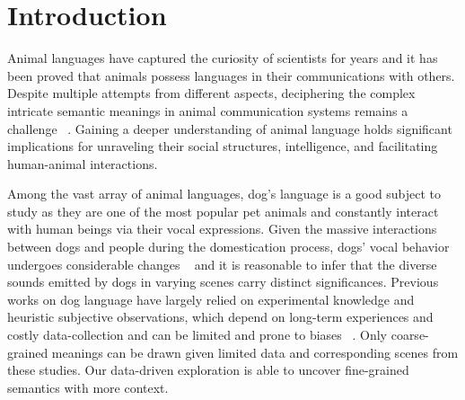\section{Introduction}
\label{sec:intro}
Animal languages have captured the curiosity of scientists for years and it has been proved that animals possess languages in their communications with others. Despite multiple attempts from different aspects, deciphering the complex intricate semantic meanings in animal communication systems remains a challenge ~\cite{andreas2022towards,scott2023animal}. Gaining a deeper understanding of animal language holds 
significant implications for unraveling their social structures, 
intelligence, and facilitating human-animal interactions. 

Among the vast array of animal languages, dog's language is
a good subject to study as they are one of the most popular pet animals and constantly interact with human beings via their vocal expressions.
Given the massive interactions between dogs and people during the domestication process, dogs' vocal behavior undergoes considerable changes ~\cite{jieyiacl2023, feddersen2000vocalization} and it is reasonable to infer that the diverse sounds emitted by dogs in varying scenes carry distinct significances.
Previous works on dog language have largely relied on experimental knowledge and heuristic
subjective observations, which depend on long-term experiences and costly 
data-collection and can be limited and prone to biases ~\cite{yin2002new,pongracz2010barking,farago2017dog}. Only coarse-grained meanings can be drawn given limited data and corresponding scenes from these studies. 
Our data-driven exploration is able to uncover fine-grained semantics with more context.
